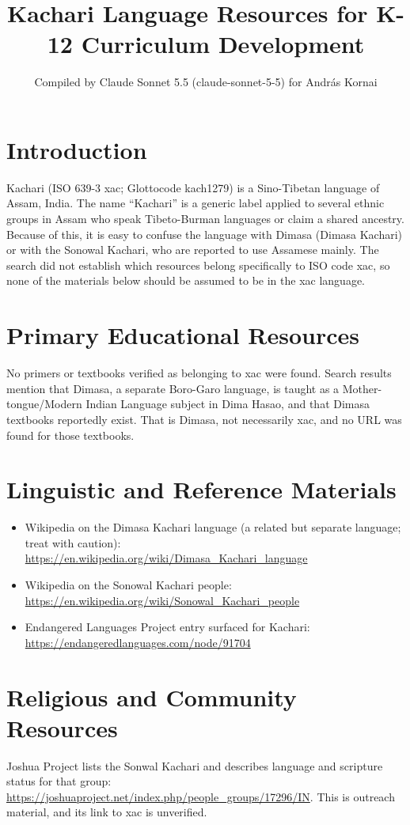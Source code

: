 \documentclass[12pt]{article}
\title{Kachari Language Resources for K-12 Curriculum Development}
\author{Compiled by Claude Sonnet 5.5 (claude-sonnet-5-5) for Andr\'as Kornai}
\date{}
\begin{document}
\maketitle

\section{Introduction}
Kachari (ISO 639-3 xac; Glottocode kach1279) is a Sino-Tibetan language of Assam, India. The name ``Kachari'' is a generic label applied to several ethnic groups in Assam who speak Tibeto-Burman languages or claim a shared ancestry. Because of this, it is easy to confuse the language with Dimasa (Dimasa Kachari) or with the Sonowal Kachari, who are reported to use Assamese mainly. The search did not establish which resources belong specifically to ISO code xac, so none of the materials below should be assumed to be in the xac language.

\section{Primary Educational Resources}
No primers or textbooks verified as belonging to xac were found. Search results mention that Dimasa, a separate Boro-Garo language, is taught as a Mother-tongue/Modern Indian Language subject in Dima Hasao, and that Dimasa textbooks reportedly exist. That is Dimasa, not necessarily xac, and no URL was found for those textbooks.

\section{Linguistic and Reference Materials}
\begin{itemize}
\item Wikipedia on the Dimasa Kachari language (a related but separate language; treat with caution): \url{https://en.wikipedia.org/wiki/Dimasa_Kachari_language}
\item Wikipedia on the Sonowal Kachari people: \url{https://en.wikipedia.org/wiki/Sonowal_Kachari_people}
\item Endangered Languages Project entry surfaced for Kachari: \url{https://endangeredlanguages.com/node/91704}
\end{itemize}

\section{Religious and Community Resources}
Joshua Project lists the Sonwal Kachari and describes language and scripture status for that group: \url{https://joshuaproject.net/index.php/people_groups/17296/IN}. This is outreach material, and its link to xac is unverified.
\end{document}
